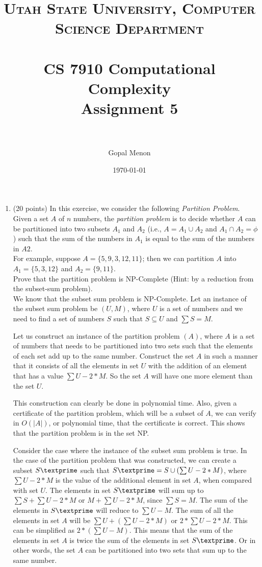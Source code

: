 \documentclass[paper=a4, fontsize=11pt]{scrartcl} %
\title{	
\normalfont \normalsize 
\textsc{Utah State University, Computer Science Department} \\ [25pt] %
\horrule{0.5pt} \\[0.4cm] %
\huge CS 7910 Computational Complexity\\Assignment 5 \\ %
\horrule{2pt} \\[0.5cm] %
}
\author{Gopal Menon} %
\date{\normalsize\today} %
\numberwithin{equation}{section} %
\numberwithin{figure}{section} %
\numberwithin{table}{section} %
\begin{document}
\maketitle %

\begin{enumerate}
\item (20 points) In this exercise, we consider the following \emph{Partition Problem}.\\
Given a set $A$ of $n$ numbers, the \emph{partition problem} is to decide whether $A$ can be partitioned into two subsets $A_1$ and $A_2$ (i.e., $A=A_1 \cup A_2$ and $A_1 \cap A_2 = \phi$) such that the sum of the numbers in $A_1$ is equal to the sum of the numbers in $A2$.\\
For example, suppose $A = \{5, 9, 3, 12, 11\}$; then we can partition $A$ into $A_1 = \{5, 3, 12\}$ and $A_2 = \{9, 11\}$.\\
Prove that the partition problem is NP-Complete (Hint: by a reduction from the subset-sum problem).\\

We know that the subset sum problem is NP-Complete. Let an instance of the subset sum problem be $(U, M)$, where $U$ is a set of numbers and we need to find a set of numbers $S$ such that $S \subseteq U$ and $\sum S = M$.

Let us construct an instance of the partition problem $(A)$, where $A$ is a set of numbers that needs to be partitioned into two sets such that the elements of each set add up to the same number. Construct the set $A$ in such a manner that it consists of all the elements in set $U$ with the addition of an element that has a value $\sum U - 2*M$. So the set $A$ will have one more element than the set $U$.

This construction can clearly be done in polynomial time. Also, given a certificate of the partition problem, which will be a subset of $A$, we can verify in $O(\left | A \right|)$, or polynomial time, that the certificate is correct. This shows that the partition problem is in the set NP. 

Consider the case where the instance of the subset sum problem is true. In the case of the partition problem that was constructed, we can create a subset $S\textprime$ such that $S\textprime = S \cup (\sum U - 2*M)$, where $\sum U - 2*M$ is the value of the additional element in set $A$, when compared with set $U$. The elements in set $S\textprime$ will sum up to $\sum S + \sum U - 2*M$ or $M + \sum U - 2*M$, since $\sum S = M$. The sum of the elements in $S\textprime$ will reduce to $\sum U - M$. The sum of all the elements in set $A$ will be $\sum U + (\sum U - 2*M)$ or $2 * \sum U - 2*M$. This can be simplified as $2*(\sum U - M)$. This means that the sum of the elements in set $A$ is twice the sum of the elements in set $S\textprime$. Or in other words, the set $A$ can be partitioned into two sets that sum up to the same number.


\end{enumerate}
\end{document}

